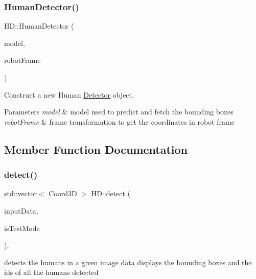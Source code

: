 \subsubsection{\texorpdfstring{Human\+Detector()}{HumanDetector()}}
{\footnotesize\ttfamily H\+D\+::\+Human\+Detector (\begin{DoxyParamCaption}\item[{std\+::unique\+\_\+ptr$<$ \hyperlink{classModel}{Model}$<$ \hyperlink{classData}{Detection\+Output}, Image $>$$>$}]{model,  }\item[{std\+::unique\+\_\+ptr$<$ \hyperlink{classFrameTransformation}{Frame\+Transformation} $>$}]{robot\+Frame }\end{DoxyParamCaption})}



Construct a new Human \hyperlink{classDetector}{Detector} object. 


\begin{DoxyParams}{Parameters}
{\em model} & model used to predict and fetch the bounding boxes \\
\hline
{\em robot\+Frame} & frame transformation to get the coordinates in robot frame \\
\hline
\end{DoxyParams}


\subsection{Member Function Documentation}
\mbox{\label{classHumanDetector_ad6939ac83173d50f4420eae30ff3f978}} 
\subsubsection{\texorpdfstring{detect()}{detect()}}
{\footnotesize\ttfamily std\+::vector$<$ Coord3D $>$ H\+D\+::detect (\begin{DoxyParamCaption}\item[{const cv\+::\+Mat \&}]{input\+Data,  }\item[{bool}]{is\+Test\+Mode }\end{DoxyParamCaption})\hspace{0.3cm}{\ttfamily [override]}, {\ttfamily [virtual]}}



detects the humans in a given image data displays the bounding boxes and the ids of all the humans detected 


